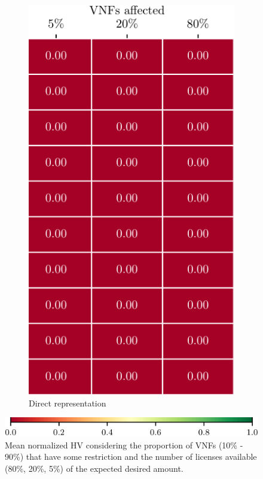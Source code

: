 \begin{figure}[t!]
\begin{subfigure}[b]{0.3732\linewidth}
        \includegraphics[width=\textwidth]{graphs/constraints/std_NSGAII_LIM-crop}
        \caption{Direct representation}
    \end{subfigure}
    \vspace{1em}

    \hspace{2em}
    \includegraphics[width=.8\linewidth]{graphs/constraints/key-crop}
    \caption{Mean normalized HV considering the proportion of VNFs (10\% - 90\%) that have some restriction and the number of licenses available (80\%, 20\%, 5\%) of the expected desired amount.}
    \label{fig:limited_licenses}
\end{figure}
